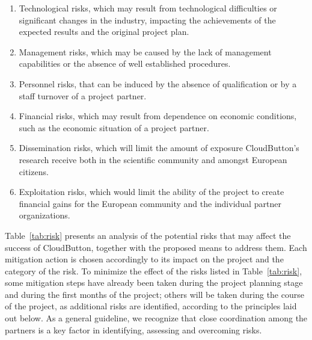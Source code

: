 \documentclass[a4paper,11pt]{article}
\newcommand{\proj}{CloudButton\xspace}
\begin{document}
\begin{enumerate}
\item Technological risks, which may result from technological difficulties or significant changes in the industry, impacting the achievements of the expected results and the original project plan.
\item Management risks, which may be caused by the lack of management capabilities or the absence of well established procedures.
\item Personnel risks, that can be induced by the absence of qualification or by a staff turnover of a project partner.
\item Financial risks, which may result from dependence on economic conditions, such as the economic situation of a project partner.
\item Dissemination risks, which will limit the amount of exposure \proj's research receive both in the scientific community and amongst European citizens.
\item Exploitation risks, which would limit the ability of the project to create financial gains for the European community and the individual partner organizations.
\end{enumerate}

Table~\ref{tab:risk} presents an analysis of the potential risks that may affect the success of \proj, together with the proposed means to address them.
Each mitigation action is chosen accordingly to its impact on the project and the category of the risk.
To minimize the effect of the risks listed in Table~\ref{tab:risk}, some mitigation steps have already been taken during the project planning stage and during the first months of the project; others will be taken during the course of the project, as additional risks are identified, according to the principles laid out below.
As a general guideline, we recognize that close coordination among the partners is a key factor in identifying, assessing and overcoming risks.
\end{document}
